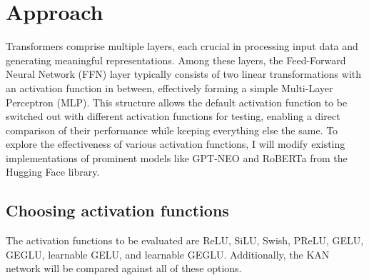\section{Approach}




Transformers comprise multiple layers, each crucial in processing input data and generating meaningful representations. Among these layers, the Feed-Forward Neural Network (FFN) layer typically consists of two linear transformations with an activation function in between, effectively forming a simple Multi-Layer Perceptron (MLP). This structure allows the default activation function to be switched out with different activation functions for testing, enabling a direct comparison of their performance while keeping everything else the same. To explore the effectiveness of various activation functions, I will modify existing implementations of prominent models like GPT-NEO and RoBERTa from the Hugging Face library.

\subsection{Choosing activation functions}
The activation functions to be evaluated are ReLU, SiLU, Swish, PReLU, GELU, GEGLU, learnable GELU, and learnable GEGLU. Additionally, the KAN network will be compared against all of these options.

